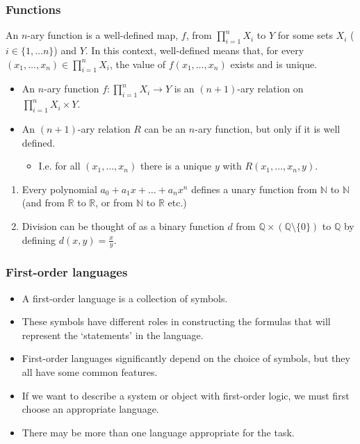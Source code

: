 \documentclass[handout]{beamer}
\newcommand{\bN}{\mathbb{N}}
\newcommand{\bQ}{\mathbb{Q}}
\newcommand{\bR}{\mathbb{R}}
\begin{document}
\begin{frame}
\frametitle{Functions}
\begin{definition}[Function]
An $n$-ary function is a well-defined map, $f$, from $\prod_{i=1}^n X_i$ to $Y$ for some sets $X_i$ ($i\in\{1,\ldots n\}$) and $Y$. In this context, well-defined means that, for every $(x_1,\ldots,x_n)\in \prod_{i=1}^n X_i$, the value of $f(x_1,\ldots,x_n)$ exists and is unique. 
\end{definition}
\begin{itemize}
\item An $n$-ary function $f:\prod_{i=1}^n X_i \to Y$ is an $(n+1)$-ary relation on $\prod_{i=1}^n X_i \times Y$.
\item An $(n+1)$-ary relation $R$ can be an $n$-ary function, but only if it is well defined. 
\begin{itemize}
\item I.e. for all $(x_1,\ldots,x_n)$ there is a unique $y$ with $R(x_1,\ldots,x_n,y)$.
\end{itemize}
\end{itemize}
\begin{example}
\begin{enumerate}
\item Every polynomial $a_0 + a_1 x+\ldots + a_n x^n$ defines a unary function from $\bN$ to $\bN$ (and from $\bR$ to $\bR$, or from $\bN$ to $\bR$ etc.)
\item Division can be thought of as a binary function $d$ from $\bQ\times (\bQ\setminus\{0\})$ to $\bQ$ by defining $d(x,y)=\frac{x}{y}$. 
\end{enumerate}
\end{example} 
\end{frame}

\begin{frame}
\frametitle{First-order languages}
\begin{itemize}
\item A first-order language is a collection of symbols.
\vspace{0.5cm}
\item These symbols have different roles in constructing the formulas that will represent the `statements' in the language.
\vspace{0.5cm}
\item First-order languages significantly depend on the choice of symbols, but they all have some common features.
\vspace{0.5cm}
\item If we want to describe a system or object with first-order logic, we must first choose an appropriate language.
\vspace{0.5cm}
\item There may be more than one language appropriate for the task.  
\end{itemize}
\end{frame}
\end{document}
